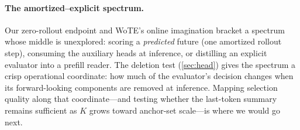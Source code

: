 \paragraph{The amortized--explicit spectrum.}
Our zero-rollout endpoint and WoTE's online imagination bracket a spectrum whose middle is unexplored: scoring a \emph{predicted} future (one amortized rollout step), consuming the auxiliary heads at inference, or distilling an explicit evaluator into a prefill reader.
The deletion test (\cref{sec:head}) gives the spectrum a crisp operational coordinate: how much of the evaluator's decision changes when its forward-looking components are removed at inference.
Mapping selection quality along that coordinate---and testing whether the last-token summary remains sufficient as $K$ grows toward anchor-set scale---is where we would go next.
